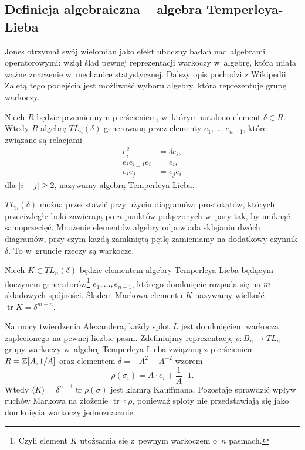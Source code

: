 \subsection{Definicja algebraiczna -- algebra Temperleya-Lieba} %
\label{sub:jones_paper}
Jones otrzymał swój wielomian jako efekt uboczny badań nad algebrami operatorowymi: wziął ślad pewnej reprezentacji warkoczy w~algebrę, która miała ważne znaczenie w~mechanice statystycznej.
Dalszy opis pochodzi z Wikipedii.
Zaletą tego podejścia jest możliwość wyboru algebry, która reprezentuje grupę warkoczy.

\begin{definition}
    Niech $R$ będzie przemiennym pierścieniem, w~którym ustalono element $\delta \in R$.
    Wtedy $R$-algebrę $TL_n(\delta)$ generowaną przez elementy $e_1, \ldots, e_{n-1}$, które związane są relacjami
    \begin{align}
        e_i^2 & = \delta e_i, \\
        e_i e_{i \pm 1} e_i & = e_i, \\
        e_i e_j & = e_j e_i
    \end{align}
    dla $|i-j| \ge 2$, nazywamy algebrą Temperleya-Lieba.
\end{definition}

$TL_n(\delta)$ można przedstawić przy użyciu diagramów: prostokątów, których przeciwległe boki zawierają po $n$ punktów połączonych w~pary tak, by uniknąć samoprzecięć. Mnożenie elementów algebry odpowiada sklejaniu dwóch diagramów, przy czym każdą zamkniętą pętlę zamieniamy na dodatkowy czynnik $\delta$.
To w~gruncie rzeczy są warkocze.

\begin{definition}
    Niech $K \in TL_n(\delta)$ będzie elementem algebry Temperleya-Lieba będącym iloczynem generatorów\footnote{Czyli element $K$ utożsamia się z~pewnym warkoczem o~$n$ pasmach.} $e_1, \ldots, e_{n-1}$, którego domknięcie rozpada się na $m$ składowych spójności.
    Śladem Markowa elementu $K$ nazywamy wielkość $\operatorname{tr} K = \delta^{m-n}$.
\end{definition}

Na mocy twierdzenia Alexandera, każdy splot $L$ jest domknięciem warkocza zaplecionego na pewnej liczbie pasm.
Zdefiniujmy reprezentację $\rho \colon B_n \to TL_n$ grupy warkoczy w~algebrę Temperleya-Lieba związaną z pierścieniem $R = \mathbb Z[A, 1/A]$ oraz elementem $\delta = -A^2 - A^{-2}$ wzorem
\begin{equation}
    \rho(\sigma_i) = A \cdot e_i + \frac{1}{A} \cdot 1.
\end{equation}
Wtedy $\langle K \rangle = \delta^{n-1} \operatorname{tr} \rho (\sigma)$ jest klamrą Kauffmana.
Pozostaje sprawdzić wpływ ruchów Markowa na złożenie $\operatorname{tr} \circ \rho$, ponieważ sploty nie przedstawiają się jako domknięcia warkoczy jednoznacznie.

